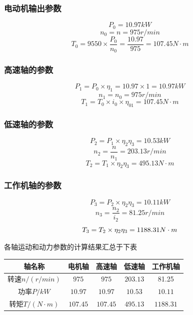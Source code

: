 \subsubsection{电动机输出参数}
\[
    P_0 = 10.97kW
\]
\[
    n_0 = n =975r/min
\]
\[
    T_0 = 9550\times \frac{P_0}{n_0}= \frac{10.97}{975} = 107.45N \cdot m
\]

\subsubsection{高速轴的参数}
\[
    P_1 = P_0 \times \eta_1 = 10.97 \times 1 =10.97 kW
\]
\[
    n_1 = n_0 =975 r/min
\]
\[
    T_1 = T_0 \times i_0 \times \eta_{01} = 107.45 N \cdot m
\]

\subsubsection{低速轴的参数}
\[
    P_2 = P_1 \times \eta_{2} \eta_{3} = 10.53 kW
\]
\[
    n_2 = \frac{n}{n_1} = 203.13 r/min
\]
\[
    T_2 = T_1 \times \eta_{2} \eta_{3} = 495.13 N \cdot m
\]
\subsubsection{工作机轴的参数}
\[
    P_3 = P_2 \times \eta_{2} \eta_{3} = 10.11 kW
\]
\[
    n_3 = \frac{n_2}{i_2} = 81.25r/min
\]
\[
    T_3 = T_2 \times \eta_{2} \eta_{3} = 1188.31N \cdot m \\
\]

各轴运动和动力参数的计算结果汇总于下表

\begin{tabular}{|c|c|c|c|c|}
    \hline
    轴名称              & 电机轴   & 高速轴   & 低速轴   & 工作机轴  \\
    \hline
    转速$n/(r/min)$     & $975$    & $ 975$   & $203.13$ & 81.25     \\
    \hline
    功率$P/kW$          & $10.97$  & $10.97$  & $10.53$  & $10.11$ \\
    \hline
    转矩$T/(N \cdot m)$ & $107.45$ & $107.45$ & $495.13$  & $1188.31$   \\
    \hline
\end{tabular}